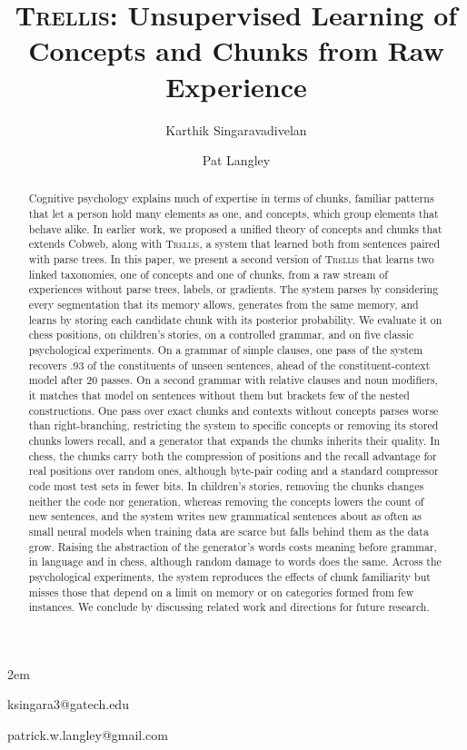 \documentclass[11pt,letterpaper]{article}
\newcommand{\trellis}{\textsc{Trellis}}
\begin{document}
\raggedbottom
\renewcommand{\topfraction}{.9}\renewcommand{\textfraction}{.1}\renewcommand{\floatpagefraction}{.8}
\emergencystretch 2em

\title{\trellis{}: Unsupervised Learning of Concepts and Chunks from Raw Experience}

\author{Karthik Singaravadivelan}{ksingara3@gatech.edu}
\author{Pat Langley}{patrick.w.langley@gmail.com}
\address{Georgia Institute of Technology, Atlanta, GA 30332 USA; \
         Institute for the Study of Learning and Expertise,
         2164 Staunton Court, Palo Alto, CA 94306 USA}

\begin{abstract}
Cognitive psychology explains much of expertise in terms of chunks, familiar patterns
that let a person hold many elements as one, and concepts, which group elements that
behave alike. In earlier work, we proposed a unified theory of concepts and chunks that
extends Cobweb, along with \trellis{}, a system that learned both from sentences paired
with parse trees. In this paper, we present a second version of \trellis{} that learns
two linked taxonomies, one of concepts and one of chunks, from a raw stream of
experiences without parse trees, labels, or gradients. The system parses by considering
every segmentation that its memory allows, generates from the same memory, and learns by
storing each candidate chunk with its posterior probability. We evaluate it on chess
positions, on children's stories, on a controlled grammar, and on five classic
psychological experiments. On a grammar of simple clauses, one pass of the system recovers .93 of the
constituents of unseen sentences, ahead of the constituent-context model after 20 passes.
On a second grammar with relative clauses and noun modifiers, it matches that model on
sentences without them but brackets few of the nested constructions.
One pass over exact chunks and contexts without concepts parses worse than
right-branching, restricting the system to specific concepts or removing its stored
chunks lowers recall, and a generator that expands the chunks inherits their quality. In
chess, the chunks carry both the compression of positions and the recall advantage for
real positions over random ones, although byte-pair coding and a standard compressor
code most test sets in fewer bits. In children's stories, removing the chunks changes
neither the code nor generation, whereas removing the concepts lowers the count of new
sentences, and the system writes new grammatical sentences about as often as small
neural models when training data are scarce but falls behind them as the data grow.
Raising the abstraction of the generator's words costs meaning before grammar, in
language and in chess, although random damage to words does the same. Across the
psychological experiments, the system reproduces the effects of chunk familiarity but
misses those that depend on a limit on memory or on categories formed from few
instances. We conclude by discussing related work and directions for future research.
\end{abstract}
\end{document}
